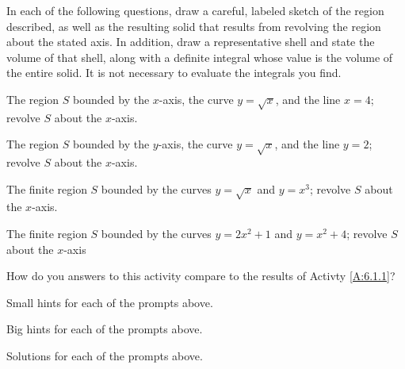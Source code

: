\begin{activity} \label{A:6.2.2}  
In each of the following questions, draw a careful, labeled sketch of the region described, as well as the resulting solid that results from revolving the region about the stated axis.  In addition, draw a representative shell and state the volume of that shell, along with a definite integral whose value is the volume of the entire solid.  It is not necessary to evaluate the integrals you find.
\ba
	\item The region $S$ bounded by the $x$-axis, the curve $y = \sqrt{x}$, and the line $x = 4$; revolve $S$ about the $x$-axis.
	\item The region $S$ bounded by the $y$-axis, the curve $y = \sqrt{x}$, and the line $y = 2$; revolve $S$ about the $x$-axis.
	\item The finite region $S$ bounded by the curves $y = \sqrt{x}$ and $y = x^3$; revolve $S$ about the $x$-axis.	
	\item The finite region $S$ bounded by the curves $y = 2x^2 + 1$ and $y  = x^2 + 4$; revolve $S$ about the $x$-axis
	\item How do you answers to this activity compare to the results of Activty \ref{A:6.1.1}? 
\ea
\end{activity}
\begin{smallhint}
\ba
	\item Small hints for each of the prompts above.
\ea
\end{smallhint}
\begin{bighint}
\ba
	\item Big hints for each of the prompts above.
\ea
\end{bighint}
\begin{activitySolution}
\ba
	\item Solutions for each of the prompts above.
\ea
\end{activitySolution}
\aftera
